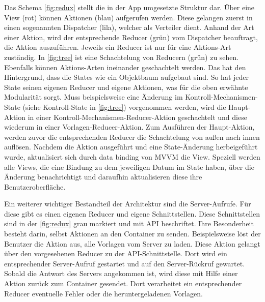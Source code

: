 \documentclass[notables, nomenclature, oneside, 150]{HSMW-Thesis}
\begin{document}
		Das Schema \ref{fig:redux} stellt die in der App umgesetzte Struktur dar. Über eine View (rot) können Aktionen (blau) aufgerufen werden. Diese gelangen zuerst in einen sogenannten Dispatcher (lila), welcher als Verteiler dient. Anhand der Art einer Aktion, wird der entsprechende Reducer (grün) vom Dispatcher beauftragt, die Aktion auszuführen. Jeweils ein Reducer ist nur für eine Aktions-Art zuständig. In \autoref{fig:tree} ist eine Schachtelung von Reducern (grün) zu sehen. Ebenfalls können Aktions-Arten ineinander geschachtelt werden. Das hat den Hintergrund, dass die States wie ein Objektbaum aufgebaut sind. So hat jeder State seinen eigenen Reducer und eigene Aktionen, was für die oben erwähnte Modularität sorgt. Muss beispielsweise eine Änderung im Kontroll-Mechanismen-State (siehe Kontroll-State in \ref{fig:tree}) vorgenommen werden, wird die Haupt-Aktion in einer Kontroll-Mechanismen-Reducer-Aktion geschachtelt und diese wiederum in einer Vorlagen-Reducer-Aktion. Zum Ausführen der Haupt-Aktion, werden zuvor die entsprechenden Reducer die Schachtelung von außen nach innen auflösen. Nachdem die Aktion ausgeführt und eine State-Änderung herbeigeführt wurde, aktualisiert sich durch data binding von MVVM die View. Speziell werden alle Views, die eine Bindung zu dem jeweiligen Datum im State haben, über die Änderung benachrichtigt und daraufhin aktualisieren diese ihre Benutzeroberfläche.

		Ein weiterer wichtiger Bestandteil der Architektur sind die Server-Aufrufe. Für diese gibt es einen eigenen Reducer und eigene Schnittstellen. Diese Schnittstellen sind in der \autoref{fig:redux} grau markiert und mit API  beschriftet. Ihre Besonderheit besteht darin, selbst Aktionen an den Container zu senden. Beispielsweise löst der Benutzer die Aktion aus, alle Vorlagen vom Server zu laden. Diese Aktion gelangt über den vorgesehenen Reducer zu der API-Schnittstelle. Dort wird ein entsprechender Server-Aufruf gestartet und auf den Server-Rückruf gewartet. Sobald die Antwort des Servers angekommen ist, wird diese mit Hilfe einer Aktion zurück zum Container gesendet. Dort verarbeitet ein entsprechender Reducer eventuelle Fehler oder die heruntergeladenen Vorlagen.
		
\end{document}
